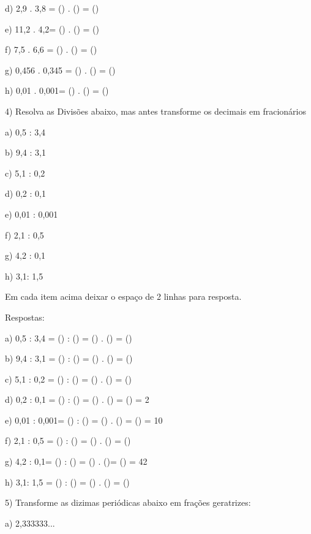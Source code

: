 d) 2,9 . 3,8 = () . () =
()

e) 11,2 . 4,2= () . () =
()

f) 7,5 . 6,6 = () . () =
()

g) 0,456 . 0,345 = () . () =
()

h) 0,01 . 0,001= () . () =
()

4) Resolva as Divisões abaixo, mas antes transforme os decimais em
fracionários

a) 0,5 : 3,4

b) 9,4 : 3,1

c) 5,1 : 0,2

d) 0,2 : 0,1

e) 0,01 : 0,001

f) 2,1 : 0,5

g) 4,2 : 0,1

h) 3,1: 1,5

Em cada item acima deixar o espaço de 2 linhas para resposta.

Respostas:

a) 0,5 : 3,4 = () : () = () .
() = ()

b) 9,4 : 3,1 = () : () = ()
. () = ()

c) 5,1 : 0,2 = () : () = ()
. () = ()

d) 0,2 : 0,1 = () : () = () .
() = () = 2

e) 0,01 : 0,001= () : () =
() . () = () = 10

f) 2,1 : 0,5 = () : () = ()
. () = ()

g) 4,2 : 0,1= () : () = () .
()= () = 42

h) 3,1: 1,5 = () : () = ()
. () = ()

5) Transforme as dizimas periódicas abaixo em frações geratrizes:

a) 2,333333...

